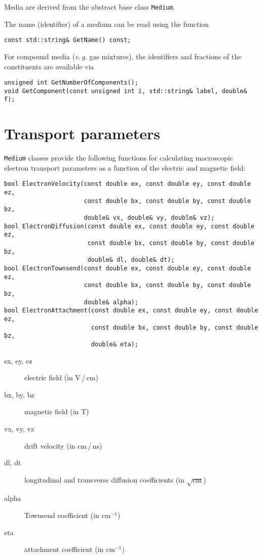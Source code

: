 Media are derived from the abstract base class \texttt{Medium}.

The name (identifier) of a medium can be read using the function
\begin{lstlisting}
const std::string& GetName() const;
\end{lstlisting}
For compound media (\textit{e.\,g.} gas mixtures), 
the identifiers and fractions of the constituents are available via
\begin{lstlisting}
unsigned int GetNumberOfComponents();
void GetComponent(const unsigned int i, std::string& label, double& f);
\end{lstlisting} 

\section{Transport parameters}

\texttt{Medium} classes provide the following functions 
for calculating macroscopic electron transport parameters 
as a function of the electric and magnetic field:
\begin{lstlisting}
bool ElectronVelocity(const double ex, const double ey, const double ez,
                      const double bx, const double by, const double bz,
                      double& vx, double& vy, double& vz);
bool ElectronDiffusion(const double ex, const double ey, const double ez,
                       const double bx, const double by, const double bz,
                       double& dl, double& dt);
bool ElectronTownsend(const double ex, const double ey, const double ez,
                      const double bx, const double by, const double bz,
                      double& alpha);
bool ElectronAttachment(const double ex, const double ey, const double ez,
                        const double bx, const double by, const double bz,
                        double& eta);
\end{lstlisting}
\begin{description}
  \item[ex, ey, ez] electric field (in V\,/\,cm)
  \item[bx, by, bz] magnetic field (in T)
  \item[vx, vy, vz] drift velocity (in cm\,/\,ns)
  \item[dl, dt] longitudinal and transverse diffusion coefficients 
     (in \(\sqrt{\text{cm}}\))
  \item[alpha] Townsend coefficient (in \(\text{cm}^{-1}\))
  \item[eta] attachment coefficient (in \(\text{cm}^{-1}\))
\end{description}

